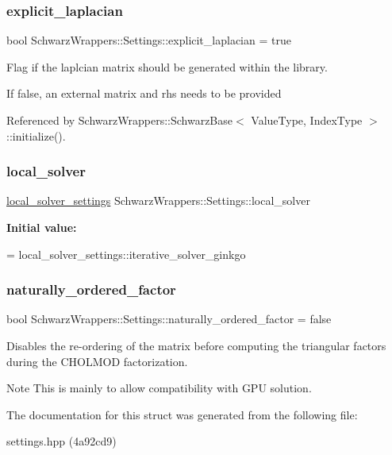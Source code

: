 \subsubsection{\texorpdfstring{explicit\+\_\+laplacian}{explicit\_laplacian}}
{\footnotesize\ttfamily bool Schwarz\+Wrappers\+::\+Settings\+::explicit\+\_\+laplacian = true}



Flag if the laplcian matrix should be generated within the library. 

If false, an external matrix and rhs needs to be provided 

Referenced by Schwarz\+Wrappers\+::\+Schwarz\+Base$<$ Value\+Type, Index\+Type $>$\+::initialize().

\mbox{\label{structSchwarzWrappers_1_1Settings_a8c46d1dc895b72927f7393c79c1ee342}} 
\subsubsection{\texorpdfstring{local\+\_\+solver}{local\_solver}}
{\footnotesize\ttfamily \hyperlink{structSchwarzWrappers_1_1Settings_abb00a70a7c715c93a2e7570ad6dc1bbe}{local\+\_\+solver\+\_\+settings} Schwarz\+Wrappers\+::\+Settings\+::local\+\_\+solver}

{\bfseries Initial value\+:}
\begin{DoxyCode}
=
        local\_solver\_settings::iterative\_solver\_ginkgo
\end{DoxyCode}
\mbox{\label{structSchwarzWrappers_1_1Settings_afd0d2bf6e98da07012fd08260114de17}} 
\subsubsection{\texorpdfstring{naturally\+\_\+ordered\+\_\+factor}{naturally\_ordered\_factor}}
{\footnotesize\ttfamily bool Schwarz\+Wrappers\+::\+Settings\+::naturally\+\_\+ordered\+\_\+factor = false}



Disables the re-\/ordering of the matrix before computing the triangular factors during the C\+H\+O\+L\+M\+OD factorization. 

\begin{DoxyNote}{Note}
This is mainly to allow compatibility with G\+PU solution. 
\end{DoxyNote}


The documentation for this struct was generated from the following file\+:\begin{DoxyCompactItemize}
\item 
settings.\+hpp (4a92cd9)\end{DoxyCompactItemize}
